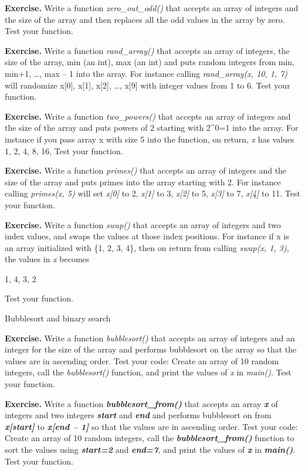 \documentclass[
]{article}
\begin{document}
\textbf{Exercise.} Write a function \emph{zero\_out\_odd()} that accepts
an array of integers and the size of the array and then replaces all the
odd values in the array by zero. Test your function.

\textbf{Exercise.} Write a function \emph{rand\_array()} that accepts an
array of integers, the size of the array, min (an int), max (an int) and
puts random integers from min, min+1, \ldots, max -- 1 into the array.
For instance calling \emph{rand\_array(x, 10, 1, 7)} will randomize
x{[}0{]}, x{[}1{]}, x{[}2{]}, \ldots, x{[}9{]} with integer values from
1 to 6. Test your function.

\textbf{Exercise.} Write a function \emph{two\_powers()} that accepts an
array of integers and the size of the array and puts powers of 2
starting with 2\^{}0=1 into the array. For instance if you pass array x
with size 5 into the function, on return, \emph{x} has values 1, 2, 4,
8, 16, Test your function.

\textbf{Exercise.} Write a function \emph{primes()} that accepts an
array of integers and the size of the array and puts primes into the
array starting with 2. For instance calling \emph{primes(x, 5)} will set
\emph{x{[}0{]}} to 2, \emph{x{[}1{]}} to 3, \emph{x{[}2{]}} to 5,
\emph{x{[}3{]}} to 7, \emph{x{[}4{]}} to 11. Test your function.

\textbf{Exercise. }Write a function \emph{swap()} that accepts an array
of integers and two index values, and swaps the values at those index
positions. For instance if x is an array initialized with \{1, 2, 3,
4\}, then on return from calling \emph{swap(x, 1, 3)}, the values in
\emph{x} becomes

1, 4, 3, 2

Test your function.

Bubblesort and binary search

\textbf{Exercise.} Write a function \emph{bubblesort()} that accepts an
array of integers and an integer for the size of the array and performs
bubblesort on the array so that the values are in ascending order. Test
your code: Create an array of 10 random integers, call the
\emph{bubblesort()} function, and print the values of \emph{x} in
\emph{main()}. Test your function.

\textbf{Exercise.} Write a function
\emph{\textbf{bubble}\textbf{s}\textbf{ort\_}\textbf{from}\textbf{()}}
that accepts an array \emph{\textbf{x}} of integers and two integers
\emph{\textbf{start}} and \emph{\textbf{end }}and performs bubblesort on
from \emph{\textbf{x{[}start{]}}} to \emph{\textbf{x{[}end -- 1{]}}} so
that the values are in ascending order. Test your code: Create an array
of 10 random integers, call the
\emph{\textbf{bubble}\textbf{s}\textbf{ort\_}\textbf{from}\textbf{()}}
function to sort the values using \emph{\textbf{start=2}} and
\emph{\textbf{end=7}}, and print the values of \emph{\textbf{x}} in
\emph{\textbf{main()}}. Test your function.
\end{document}
